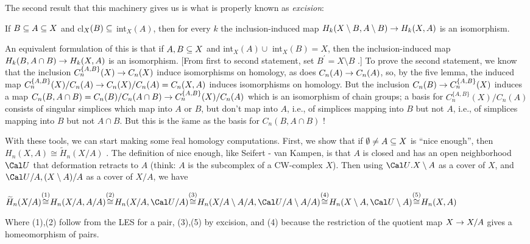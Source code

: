 \bsk

The second result that this machinery gives us is what is properly known as {\it excision}:

\msk

If $B\subseteq A\subseteq X$ and cl$_X(B)\subseteq$ int$_X(A)$, then for every $k$ the inclusion-induced map 
$H_k(X\setminus B,A\setminus B)\rightarrow H_k(X,A)$ is an isomorphism. 

\msk

An equivalent formulation of this is that if $A,B\subseteq X$ and int$_X(A)\cup$ int$_X(B) = X$, then the
inclusion-induced map $H_k(B,A\cap B)\rightarrow H_k(X,A)$ is an isomorphism. [From first to second
statement, set $B^\prime = X\setminus B$ .] To prove the second statement, we know that
the inclusion $C_n^{\{A,B\}}(X) \rightarrow C_n(X)$ induce isomorphisms on homology, as does 
$C_n(A) \rightarrow C_n(A)$, so, by the five lemma, the induced map
$C_n^{\{A,B\}}(X)/C_n(A) \rightarrow C_n(X)/C_n(A) = C_n(X,A)$ induces isomorphisms on homology. 
But the inclusion $C_n(B) \rightarrow C_n^{\{A,B\}}(X)$ induces a map 
$C_n(B,A\cap B) = C_n(B)/C_n(A\cap B) \rightarrow C_n^{\{A,B\}}(X)/C_n(A)$ which is an isomorphism of chain groups;
a basis for $C_n^{\{A,B\}}(X)/C_n(A)$ consists of singular simplices which map into $A$ or $B$, but don't map into $A$,
i.e., of simplices mapping into $B$ but not $A$, i.e., of simplices mapping into $B$ but not $A\cap B$.
But this is the \u{same} as the basis for $C_n(B,A\cap B)$ !

\msk

With these tools, we can start making some \u{real} homology computations. First, we show that 
if $\emptyset\neq A\subseteq X$ is ``nice enough'', then $H_n(X,A)\cong \widetilde{H}_n(X/A)$ .
The definition of nice enough, like Seifert - van Kampen, is that $A$ is closed and has an open neighborhood
${\Cal U}$ that deformation retracts to $A$ (think: $A$ is the subcomplex of a CW-complex $X$).
Then using ${\Cal U}.X\setminus A$ as a cover of $X$, and ${\Cal U}/A,(X\setminus A)/A$ as a cover of $X/A$,
 we have

\ssk

$\widetilde{H}_n(X/A) {\buildrel {(1)}\over \cong} H_n(X/A,A/A){\buildrel {(2)}\over \cong} 
H_n(X/A,{\Cal U}/A) {\buildrel {(3)}\over \cong} H_n(X/A\setminus A/A,{\Cal U}/A\setminus A/A) {\buildrel {(4)}\over \cong}
H_n(X\setminus A,{\Cal U}\setminus A){\buildrel {(5)}\over \cong} H_n(X,A)$

\ssk

Where (1),(2) follow from the LES for a pair, (3),(5) by excision, and (4) because the restriction of the quotient
map $X\rightarrow X/A$ gives a homeomorphism of pairs.

